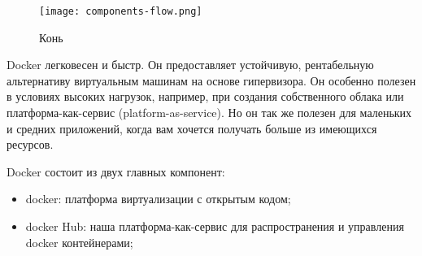 \begin{figure}[h!]
\centering
	\texttt{[image: components-flow.png]}
	\caption{Конь}
\end{figure}
\clearpage

Docker легковесен и быстр. Он предоставляет устойчивую, рентабельную альтернативу виртуальным машинам на основе гипервизора. Он особенно полезен в условиях высоких нагрузок, например, при создания собственного облака или платформа-как-сервис (platform-as-service). Но он так же полезен для маленьких и средних приложений, когда вам хочется получать больше из имеющихся ресурсов.

Docker состоит из двух главных компонент:

\begin{itemize}
  \item docker: платформа виртуализации с открытым кодом;
  \item docker Hub: наша платформа-как-сервис для распространения и управления docker контейнерами;
\end{itemize}

